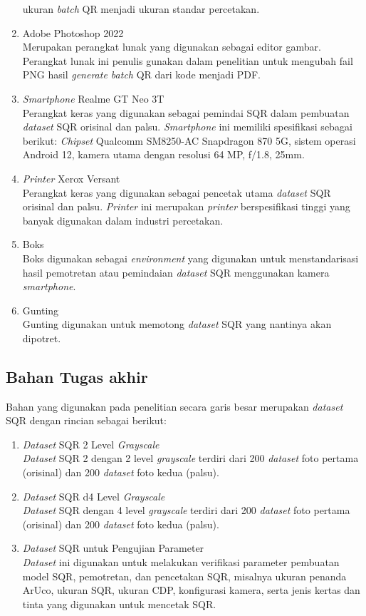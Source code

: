 \begin{enumerate}
	      ukuran \emph{batch} QR menjadi ukuran standar percetakan.
	\item Adobe Photoshop 2022\\Merupakan perangkat lunak yang digunakan sebagai editor gambar. Perangkat lunak ini penulis gunakan dalam penelitian untuk mengubah fail
	      PNG hasil \emph{generate batch} QR dari kode menjadi PDF.
	\item \emph{Smartphone} Realme GT Neo 3T\\Perangkat keras yang digunakan sebagai pemindai SQR dalam pembuatan \emph{dataset} SQR orisinal dan palsu. \emph{Smartphone} ini memiliki spesifikasi sebagai berikut: \emph{Chipset} Qualcomm SM8250-AC Snapdragon 870 5G, sistem operasi Android 12, kamera utama dengan resolusi 64 MP, f/1.8, 25mm.
	\item \emph{Printer} Xerox Versant\\Perangkat keras yang digunakan sebagai pencetak utama \emph{dataset} SQR orisinal dan palsu. \emph{Printer} ini merupakan \emph{printer} berspesifikasi tinggi yang banyak digunakan dalam industri percetakan.
	\item Boks\\Boks digunakan sebagai \emph{environment} yang digunakan untuk menstandarisasi hasil pemotretan atau pemindaian \emph{dataset} SQR menggunakan kamera
	      \emph{smartphone}.
	\item Gunting\\Gunting digunakan untuk memotong \emph{dataset} SQR yang nantinya akan dipotret.
\end{enumerate}

\subsection{Bahan Tugas akhir}

Bahan yang digunakan pada penelitian secara garis besar merupakan \emph{dataset} SQR dengan rincian sebagai berikut:

\begin{enumerate}
	\item \emph{Dataset} SQR 2 Level \emph{Grayscale}\\\emph{Dataset} SQR 2 dengan 2 level \emph{grayscale} terdiri dari 200 \emph{dataset} foto pertama (orisinal) dan 200 \emph{dataset} foto kedua (palsu).
	\item \emph{Dataset} SQR d4 Level \emph{Grayscale}\\\emph{Dataset} SQR dengan 4 level \emph{grayscale} terdiri dari 200 \emph{dataset} foto pertama (orisinal) dan 200 \emph{dataset} foto kedua (palsu).
	\item \emph{Dataset} SQR untuk Pengujian Parameter\\\emph{Dataset} ini digunakan untuk melakukan verifikasi parameter pembuatan model SQR, pemotretan, dan pencetakan SQR, misalnya ukuran penanda ArUco, ukuran SQR, ukuran CDP, konfigurasi kamera, serta jenis kertas dan tinta yang digunakan untuk mencetak SQR.
\end{enumerate}

